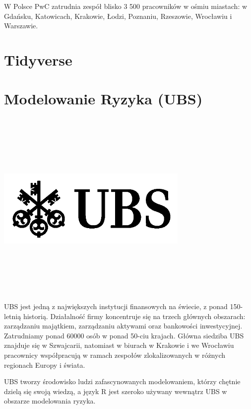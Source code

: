 \documentclass[11pt,twoside,b5paper]{book}
\begin{document}
W Polsce PwC zatrudnia zespół blisko 3 500 pracowników w ośmiu miastach: w Gdańsku, Katowicach, Krakowie, Łodzi, Poznaniu, Rzeszowie, Wrocławiu i Warszawie.
\newpage



\newpage
\section{Tidyverse}{}

\newpage



\section{Modelowanie Ryzyka (UBS)}
\\ \ \\ \ \\ \ \\ \ \\ 
\begin{minipage}[t]{0.915\textwidth}
	\center     
    \includegraphics[width=350px]{img/logos.bw/ubs2.png} 
\end{minipage}
\\ \ \\ \ \\ \ \\ \ \\ 
UBS jest jedną z największych instytucji finansowych na świecie, z ponad 150-letnią historią. Działalność firmy koncentruje się na trzech głównych obszarach: zarządzaniu majątkiem, zarządzaniu aktywami oraz bankowości inwestycyjnej. Zatrudniamy ponad 60000 osób w ponad 50-ciu krajach. Główna siedziba UBS znajduje się w Szwajcarii, natomiast w biurach w Krakowie i we Wrocławiu pracownicy współpracują w ramach zespołów zlokalizowanych w różnych regionach Europy i świata.

UBS tworzy środowisko ludzi zafascynowanych modelowaniem, którzy chętnie dzielą się swoją wiedzą, a język R jest szeroko używany wewnątrz UBS w obszarze modelowania ryzyka.
\newpage


\newpage
\end{document}
